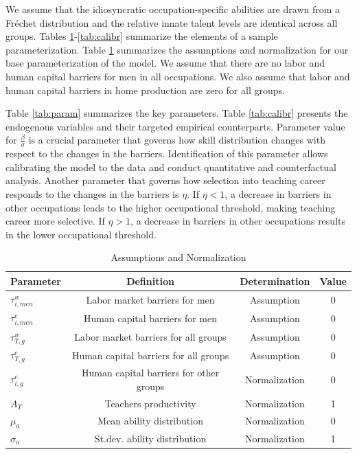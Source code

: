 \documentclass[onehalfspacing,11pt]{article}
\begin{document}
We assume that the idiosyncratic occupation-specific abilities are drawn from a Fr\'echet distribution and the relative innate talent levels are identical across all groups. Tables \ref{tab:assump}-\ref{tab:calibr} summarize the elements of a sample parameterization. Table \ref{tab:assump} summarizes the assumptions and normalization for our base parameterization of the model. We assume that there are no labor and human capital barriers for men in all occupations. We also assume that labor and human capital barriers in home production are zero for all groups.

Table \ref{tab:param} summarizes the key parameters. Table \ref{tab:calibr} presents the endogenous variables and their targeted empirical counterparts. Parameter value for $\frac{\beta}{\sigma}$ is a crucial parameter that governs how skill distribution changes with respect to the changes in the barriers. Identification of this parameter allows calibrating the model to the data and conduct quantitative and counterfactual analysis. Another parameter that governs how selection into teaching career responds to the changes in the barriers is $\eta$. If $\eta<1$, a decrease in barriers in other occupations leads to the higher occupational threshold, making teaching career more selective. If $\eta>1$, a decrease in barriers in other occupations results in the lower occupational threshold.

	\begin{table}[h!]
		\centering
		\begin{tabular}{lccc}
			\toprule
			\toprule
			Parameter & Definition & Determination & Value\\
			\midrule
			$\tau^{w}_{i,men}$ & Labor market barriers for men & Assumption & 0\\
			$\tau^{e}_{i,men}$ & Human capital barriers for men & Assumption & 0\\
			$\tau^{w}_{T,g}$ & Labor market barriers for all groups & Assumption & 0\\
			$\tau^{e}_{T,g}$ & Human capital barriers for all groups & Assumption & 0\\
			$\tau^{e}_{i,g}$ & Human capital barriers for other groups & Normalization & 0\\
			$A_{T}$ & Teachers productivity & Normalization & 1\\
			$\mu_a$ & Mean ability distribution & Normalization & 0\\
			$\sigma_a$ & St.dev. ability distribution & Normalization & 1\\
			\bottomrule
		\end{tabular}
		\caption{Assumptions and Normalization}
		\label{tab:assump}
	\end{table}
	
\end{document}

